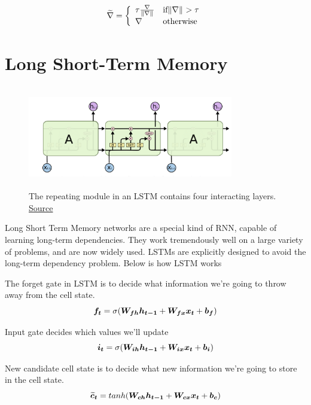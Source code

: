 \[
\widetilde{\nabla}=\left\{
            \begin{array}{ll}
              \tau\frac{\nabla}{\norm{\nabla}} & \text{if}  \norm{\nabla}>\tau\\
              \nabla & \text{otherwise}
            \end{array}
          \right.
\]

\section{Long Short-Term Memory}
\label{sec:long-short-term-memory}


\begin{figure}[h]
  \centering
      \includegraphics[width=0.8\textwidth,height=4.5cm]{figs/lstm.png}
          \caption{
            The repeating module in an LSTM contains four interacting layers.
            \href{http://colah.github.io/posts/2015-08-Understanding-LSTMs/}{Source}
          }
          \label{fig:lstm}
\end{figure}

Long Short Term Memory networks \cite{article-lstm} are a special kind of RNN, capable of learning long-term dependencies. 
They work tremendously well on a large variety of problems, and are now widely used.
LSTMs are explicitly designed to avoid the long-term dependency problem. 
Below is how LSTM works

The forget gate in LSTM is to decide what information we’re going to throw away from the cell state.
\[\vect{f_t} = \sigma(\matr{W_{fh}}\vect{h_{t-1}}+\matr{W_{fx}}\vect{x_t} + \vect{b_f}) \]

Input gate decides which values we’ll update
\[\vect{i_t} = \sigma(\matr{W_{ih}}\vect{h_{t-1}} + \matr{W_{ix}}\vect{x_t} + \vect{b_i})\]

New candidate cell state is to decide what new information we’re going to store in the cell state.
\[\vect{\widetilde{c}_t} = tanh(\matr{W_{ch}}\vect{h_{t-1}} + \matr{W_{cx}}\vect{x_t} + \vect{b_c})\]

